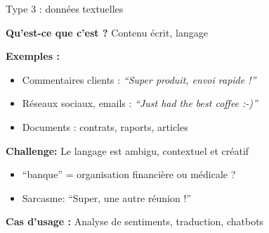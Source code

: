 \begin{frame}{Type 3 : données textuelles}

\textbf{Qu'est-ce que c'est ?} Contenu écrit, langage

\vspace{0.5cm}

\textbf{Exemples :}
\begin{itemize}
    \item Commentaires clients : \textit{``Super produit, envoi rapide !''}
    \item Réseaux sociaux, emails : \textit{``Just had the best coffee :-)''}
    \item Documents : contrats, raports, articles
\end{itemize}

\vspace{0.5cm}

\textbf{Challenge:} Le langage est ambigu, contextuel et créatif
\begin{itemize}
    \item ``banque'' = organisation financière ou médicale ?
    \item Sarcasme: ``Super, une autre réunion !''
\end{itemize}

\vspace{0.3cm}

\textbf{Cas d'usage :} Analyse de sentiments, traduction, chatbots

\end{frame}


